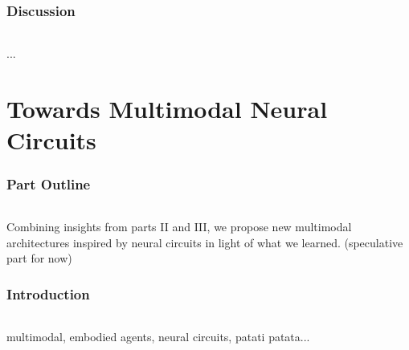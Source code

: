 \documentclass{article}
\begin{document}
\section{Discussion}

\paragraph{}...

\part{Towards Multimodal Neural Circuits} %

\section*{Part Outline}

\paragraph{}Combining insights from parts II and III, we propose new multimodal architectures inspired by neural circuits in light of what we learned. (speculative part for now)

\section{Introduction}

\paragraph{}multimodal, embodied agents, neural circuits, patati patata...
\end{document}
